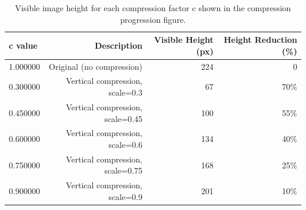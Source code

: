 \begin{table}[htbp]
\caption{Visible image height for each compression factor c shown in the compression progression figure.}
\label{tab:compression_progression}
\begin{tabular}{lrrr}
\toprule
c value & Description & Visible Height (px) & Height Reduction (\%) \\
\midrule
1.000000 & Original (no compression) & 224 & 0 \\
0.300000 & Vertical compression, scale=0.3 & 67 & 70\% \\
0.450000 & Vertical compression, scale=0.45 & 100 & 55\% \\
0.600000 & Vertical compression, scale=0.6 & 134 & 40\% \\
0.750000 & Vertical compression, scale=0.75 & 168 & 25\% \\
0.900000 & Vertical compression, scale=0.9 & 201 & 10\% \\
\bottomrule
\end{tabular}
\end{table}

